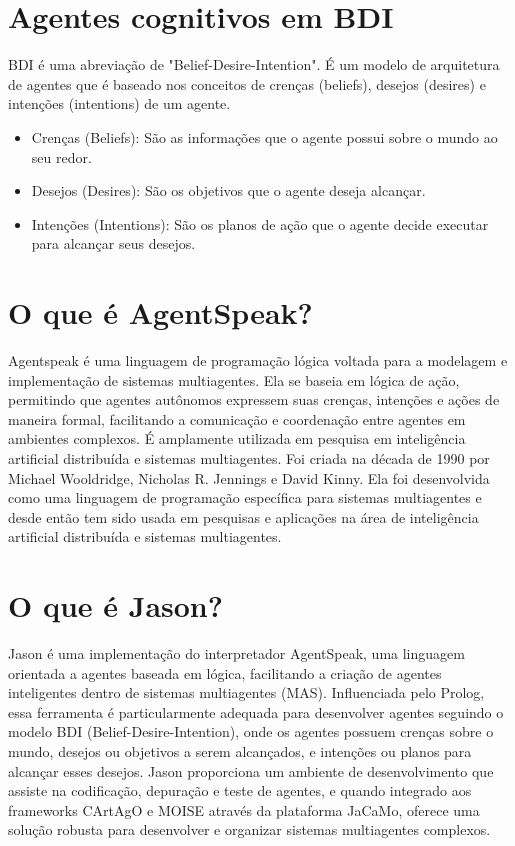 \documentclass[12pt]{article}
\begin{document}
	\section{Agentes cognitivos em BDI}
	\label{sec:agentes_cog}

    BDI é uma abreviação de "Belief-Desire-Intention". É um modelo de arquitetura de agentes que é baseado nos conceitos de crenças (beliefs), desejos (desires) e intenções (intentions) de um agente.
    \begin{itemize}
    \item Crenças (Beliefs): São as informações que o agente possui sobre o mundo ao seu redor.
    \item Desejos (Desires): São os objetivos que o agente deseja alcançar.
    \item Intenções (Intentions): São os planos de ação que o agente decide executar para alcançar seus desejos.
    \end{itemize}

    \section{O que é AgentSpeak?}
	\label{sec:sis_multiagente}

    Agentspeak é uma linguagem de programação lógica voltada para a modelagem e implementação de sistemas multiagentes. Ela se baseia em lógica de ação, permitindo que agentes autônomos expressem suas crenças, intenções e ações de maneira formal, facilitando a comunicação e coordenação entre agentes em ambientes complexos. É amplamente utilizada em pesquisa em inteligência artificial distribuída e sistemas multiagentes. Foi criada na década de 1990 por Michael Wooldridge, Nicholas R. Jennings e David Kinny. Ela foi desenvolvida como uma linguagem de programação específica para sistemas multiagentes e desde então tem sido usada em pesquisas e aplicações na área de inteligência artificial distribuída e sistemas multiagentes.

    \section{O que é Jason?}
	\label{sec:sis_multiagente}

    Jason é uma implementação do interpretador AgentSpeak, uma linguagem orientada a agentes baseada em lógica, facilitando a criação de agentes inteligentes dentro de sistemas multiagentes (MAS). Influenciada pelo Prolog, essa ferramenta é particularmente adequada para desenvolver agentes seguindo o modelo BDI (Belief-Desire-Intention), onde os agentes possuem crenças sobre o mundo, desejos ou objetivos a serem alcançados, e intenções ou planos para alcançar esses desejos. Jason proporciona um ambiente de desenvolvimento que assiste na codificação, depuração e teste de agentes, e quando integrado aos frameworks CArtAgO e MOISE através da plataforma JaCaMo, oferece uma solução robusta para desenvolver e organizar sistemas multiagentes complexos.
\end{document}
